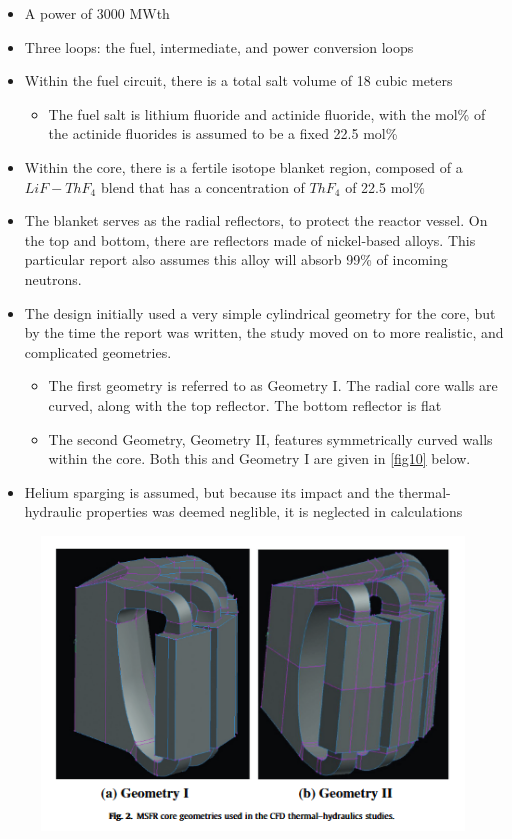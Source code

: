 \documentclass[letterpaper]{article}
\begin{document}
\begin{itemize}
\item A power of 3000 MWth
\item Three loops: the fuel, intermediate, and power conversion loops
\item Within the fuel circuit, there is a total salt volume of 18 cubic meters
	\begin{itemize}
	\item The fuel salt is lithium fluoride and actinide fluoride, with the mol\% of the actinide fluorides is assumed to be a fixed 22.5 mol\%
	\end{itemize}
\item Within the core, there is a fertile isotope blanket region, composed of a $LiF - ThF_4$ blend that has a concentration of $ThF_4$ of 22.5 mol\%
\item The blanket serves as the radial reflectors, to protect the reactor vessel.  On the top and bottom, there are reflectors made of nickel-based alloys.  This particular report also assumes this alloy will absorb 99\% of incoming neutrons.
\item The design initially used a very simple cylindrical geometry for the core, but by the time the report was written, the study moved on to more realistic, and complicated geometries.
	\begin{itemize}
	\item The first geometry is referred to as Geometry I.  The radial core walls are curved, along with the top reflector.  The bottom reflector is flat
	\item The second Geometry, Geometry II, features symmetrically curved walls within the core.  Both this and Geometry I are given in \ref{fig10} below.
	\end{itemize}
\item Helium sparging is assumed, but because its impact and the thermal-hydraulic properties was deemed neglible, it is neglected in calculations
\end{itemize} 

\begin{figure}[H]
  \centering
  \includegraphics[width=1.0\linewidth]{figures/MSFRsource1.png}
  \label{fig:fig10}
\end{figure}
\end{document}
